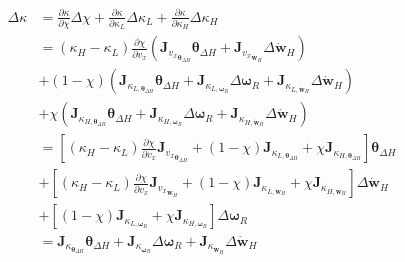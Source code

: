 \begin{equation}
    \begin{split}
        \Delta \kappa &= \frac{\partial\kappa}{\partial\chi}\Delta\chi + \frac{\partial\kappa}{\partial\kappa_L}\Delta\kappa_L + \frac{\partial\kappa}{\partial\kappa_H}\Delta\kappa_H \\
        &= \left(\kappa_H - \kappa_L\right)\frac{\partial\chi}{\partial v_x}\left(\mathbf{J}_{{v_x}_{\boldsymbol{\theta}_{\Delta H}}} \boldsymbol{\theta}_{\Delta H} + \mathbf{J}_{{v_x}_{\dot{\mathbf{w}}_H}} \Delta {\dot{\mathbf{w}}}_H\right)\\
        &+ \left(1-\chi\right)\left(\mathbf{J}_{\kappa_{L, \boldsymbol{\theta}_{\Delta H}}}\boldsymbol{\theta}_{\Delta H} + \mathbf{J}_{\kappa_{L, \boldsymbol{\omega}_R}}\Delta \boldsymbol{\omega}_R + \mathbf{J}_{\kappa_{L, \dot{\mathbf{w}}_H}}\Delta {\dot{\mathbf{w}}}_H\right)\\
        &+ \chi\left(\mathbf{J}_{\kappa_{H, \boldsymbol{\theta}_{\Delta H}}}\boldsymbol{\theta}_{\Delta H} + \mathbf{J}_{\kappa_{H, \boldsymbol{\omega}_R}}\Delta \boldsymbol{\omega}_R + \mathbf{J}_{\kappa_{H, \dot{\mathbf{w}}_H}}\Delta {\dot{\mathbf{w}}}_H\right)\\
        &= \left[\left(\kappa_H - \kappa_L\right)\frac{\partial\chi}{\partial v_x}\mathbf{J}_{{v_x}_{\boldsymbol{\theta}_{\Delta H}}} + \left(1-\chi\right)\mathbf{J}_{\kappa_{L, \boldsymbol{\theta}_{\Delta H}}} + \chi \mathbf{J}_{\kappa_{H, \boldsymbol{\theta}_{\Delta H}}}\right] \boldsymbol{\theta}_{\Delta H}\\
        &+ \left[\left(\kappa_H - \kappa_L\right)\frac{\partial\chi}{\partial v_x}\mathbf{J}_{{v_x}_{\dot{\mathbf{w}}_H}} + \left(1-\chi\right)\mathbf{J}_{\kappa_{L, \dot{\mathbf{w}}_H}} + \chi \mathbf{J}_{\kappa_{H, \dot{\mathbf{w}}_H}}\right] \Delta {\dot{\mathbf{w}}}_H\\
        &+ \left[\left(1-\chi\right)\mathbf{J}_{\kappa_{L, \boldsymbol{\omega}_R}} + \chi \mathbf{J}_{\kappa_{H, \boldsymbol{\omega}_R}}\right] \Delta \boldsymbol{\omega}_R\\
        &= \mathbf{J}_{\kappa_{\boldsymbol{\theta}_{\Delta H}}}\boldsymbol{\theta}_{\Delta H} + \mathbf{J}_{\kappa_{\boldsymbol{\omega}_R}}\Delta \boldsymbol{\omega}_R + \mathbf{J}_{\kappa_{\dot{\mathbf{w}}_H}}\Delta {\dot{\mathbf{w}}}_H
    \end{split}
\end{equation}
